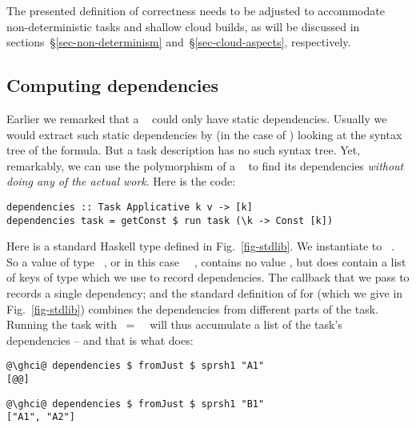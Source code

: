 The presented definition of correctness needs to be adjusted to accommodate
non-deterministic tasks and shallow cloud builds, as will be discussed
in sections~\S\ref{sec-non-determinism} and~\S\ref{sec-cloud-aspects},
respectively.

\subsection{Computing dependencies}\label{sec-deps}\label{secdeps}

Earlier we remarked that a ~ could only have static
dependencies. Usually we would extract such static dependencies by (in the case
of \Excel) looking at the syntax tree of the formula.  But a task description
has no such syntax tree. Yet, remarkably, we can use the polymorphism of a
~ to find its dependencies \emph{without doing any of
the actual work}. Here is the code:

\vspace{1mm}
\begin{verbatim}
dependencies :: Task Applicative k v -> [k]
dependencies task = getConst $ run task (\k -> Const [k])
\end{verbatim}
\vspace{1mm}

\noindent
Here  is a standard Haskell type defined in Fig.~\ref{fig-stdlib}. We
instantiate  to ~\hs{[@@k]}. So a value of type ~,
or in this case ~\hs{[@@k]}~, contains no value , but does
contain a list of keys of type \hs{[@@k]} which we use to record dependencies.
The  callback that we pass to  records a single dependency;
and the standard definition of  for  (which we give
in Fig.~\ref{fig-stdlib}) combines the dependencies from different parts of the
task. Running the task with ~=~~\hs{[@@k]} will thus
accumulate a list of the task's dependencies -- and that is what
 does:
\vspace{1mm}
\begin{verbatim}
@\ghci@ dependencies $ fromJust $ sprsh1 "A1"
[@@]
\end{verbatim}
\begin{verbatim}
@\ghci@ dependencies $ fromJust $ sprsh1 "B1"
["A1", "A2"]
\end{verbatim}
\vspace{1mm}

